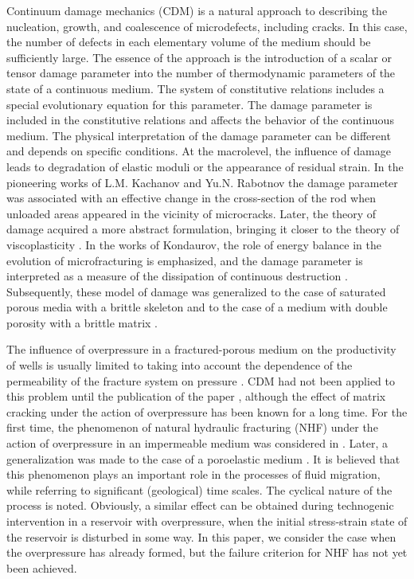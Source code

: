 \documentclass[article,authoryear,jpm]{beg_39}             %
\begin{document}
Continuum damage mechanics (CDM) is a natural approach to describing the nucleation, growth, and coalescence of microdefects, including cracks. In this case, the number of defects in each elementary volume of the medium should be sufficiently large. The essence of the approach is the introduction of a scalar or tensor damage parameter into the number of thermodynamic parameters of the state of a continuous medium. The system of constitutive relations includes a special evolutionary equation for this parameter. The damage parameter is included in the constitutive relations and affects the behavior of the continuous medium. The physical interpretation of the damage parameter can be different and depends on specific conditions. At the macrolevel, the influence of damage leads to degradation of elastic moduli or the appearance of residual strain. In the pioneering works of L.M. Kachanov and Yu.N. Rabotnov the damage parameter was associated with an effective change in the cross-section of the rod when unloaded areas appeared in the vicinity of microcracks. Later, the theory of damage acquired a more abstract formulation, bringing it closer to the theory of viscoplasticity \cite{Lemaitre, Murakami}. In the works of Kondaurov, the role of energy balance in the evolution of microfracturing is emphasized, and the damage parameter is interpreted as a measure of the dissipation of continuous destruction \cite{Kondaurov2002}. Subsequently, these model of damage was generalized to the case of saturated porous media with a brittle skeleton \cite{Izvekov} and to the case of a medium with double porosity with a brittle matrix \cite{Izvekov2020}.

The influence of overpressure in a fractured-porous medium on the productivity of wells is usually limited to taking into account the dependence of the permeability of the fracture system on pressure \cite{Thompson}. CDM had not been applied to this problem until the publication of the paper \cite{Izvekov2020}, although the effect of matrix cracking under the action of overpressure has been known for a long time. For the first time, the phenomenon of natural hydraulic fracturing (NHF) under the action of overpressure in an impermeable medium was considered in \cite{Secor}. Later, a generalization was made to the case of a poroelastic medium \cite{Engelder, Luo}. It is believed that this phenomenon plays an important role in the processes of fluid migration, while referring to significant (geological) time scales. The cyclical nature of the process is noted. Obviously, a similar effect can be obtained during technogenic intervention in a reservoir with overpressure, when the initial stress-strain state of the reservoir is disturbed in some way. In this paper, we consider the case when the overpressure has already formed, but the failure criterion for NHF has not yet been achieved.
\end{document}
